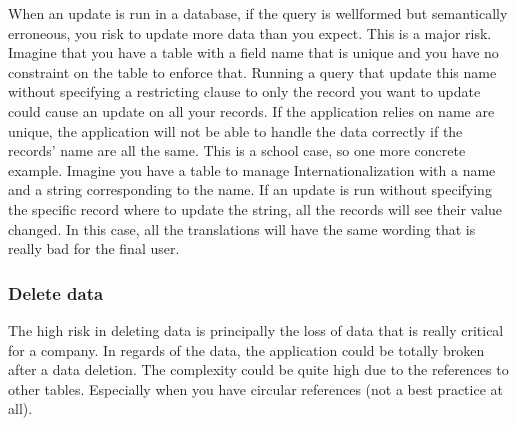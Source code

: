 When an update is run in a database, if the query is wellformed but semantically erroneous, you risk to update more data than you expect. This is a major risk. Imagine that you have a table with a field name that is unique and you have no constraint on the table to enforce that. Running a query that update this name without specifying a restricting clause to only the record you want to update could cause an update on all your records. If the application relies on name are unique, the application will not be able to handle the data correctly if the records' name are all the same. This is a school case, so one more concrete example. Imagine you have a table to manage Internationalization with a name and a string corresponding to the name. If an update is run without specifying the specific record where to update the string, all the records will see their value changed. In this case, all the translations will have the same wording that is really bad for the final user.

\subsubsection{Delete data\\}

The high risk in deleting data is principally the loss of data that is really critical for a company. In regards of the data, the application could be totally broken after a data deletion. The complexity could be quite high due to the references to other tables. Especially when you have circular references (not a best practice at all).